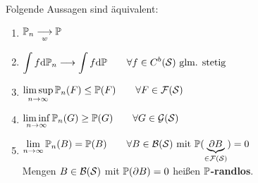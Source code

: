 \begin{satz}\enter\label{satz4.2}
	Folgende Aussagen sind äquivalent:
	\begin{enumerate}[label=(\arabic*)]
		\item $\begin{aligned}
			\P_n\stackrelnew{w}{}{\longrightarrow} \P
		\end{aligned}$
		\item $\begin{aligned}
			\int\limits f\d \P_n\stackrel{}{\longrightarrow}\int\limits f\d \P\qquad\forall f\in C^b(\S)\text{ glm. stetig}
		\end{aligned}$
		\item $\begin{aligned}
			\limsup\limits_{n\to\infty} \P_n(F)\leq \P(F)\qquad\forall F\in\F(\S)
		\end{aligned}$
		\item $\begin{aligned}
			\liminf\limits_{n\to\infty} \P_n(G)\geq \P(G)\qquad\forall G\in\G(\S)
		\end{aligned}$
		\item $\begin{aligned}
			\limn \P_n(B)=\P(B)\qquad\forall B\in\B(\S)\mit \P(\underbrace{\partial B}_{\in\F(\S)})=0
		\end{aligned}$\\
		Mengen $B\in\B(\S)$ mit $\P(\partial B)=0$ heißen \textbf{$\P$-randlos}.
	\end{enumerate}
\end{satz}

